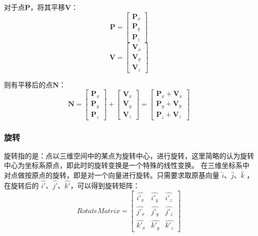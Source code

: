 \documentclass[12pt,oneside,a4paper]{ctexart}
\begin{document}
对于点$\mathbf{P}$，将其平移$\mathbf{V}$：
\begin{equation*}
	\mathbf{P}=
	\begin{bmatrix}
		\mathbf{P}_x \\
		\mathbf{P}_y \\
		\mathbf{P}_z
	\end{bmatrix}
\end{equation*}
\begin{equation*}
	\mathbf{V}=
	\begin{bmatrix}
		\mathbf{V}_x \\
		\mathbf{V}_y \\
		\mathbf{V}_z
	\end{bmatrix}
\end{equation*}

则有平移后的点$\mathbf{N}$：
\begin{equation*}
	\mathbf{N}=
	\begin{bmatrix}
		\mathbf{P}_x \\
		\mathbf{P}_y \\
		\mathbf{P}_z
	\end{bmatrix}+\begin{bmatrix}
		\mathbf{V}_x \\
		\mathbf{V}_y \\
		\mathbf{V}_z
	\end{bmatrix} =
	\begin{bmatrix}
		\mathbf{P}_x + \mathbf{V}_x \\
		\mathbf{P}_y + \mathbf{V}_y \\
		\mathbf{P}_z + \mathbf{V}_z
	\end{bmatrix}
\end{equation*}
\subsubsection{旋转}
旋转指的是：点以三维空间中的某点为旋转中心，进行旋转，这里简略的认为旋转中心为坐标系原点，即此时的旋转变换是一个特殊的线性变换。
在三维坐标系中对点做按原点的旋转，即是对一个向量进行旋转。只需要求取原基向量 $\hat{i}$、$\hat{j}$、$\hat{k}$ ，在旋转后的 $\hat{i'}$、$\hat{j'}$、$\hat{k'}$，可以得到旋转矩阵：
\begin{equation*}
	RotateMatrix =
	\begin{bmatrix}
		\hat{i'_x} & \hat{i'_y} & \hat{i'_z} \\
		\hat{j'_x} & \hat{j'_y} & \hat{j'_z} \\
		\hat{k'_x} & \hat{k'_y} & \hat{k'_z}
	\end{bmatrix}
\end{equation*}
\end{document}
